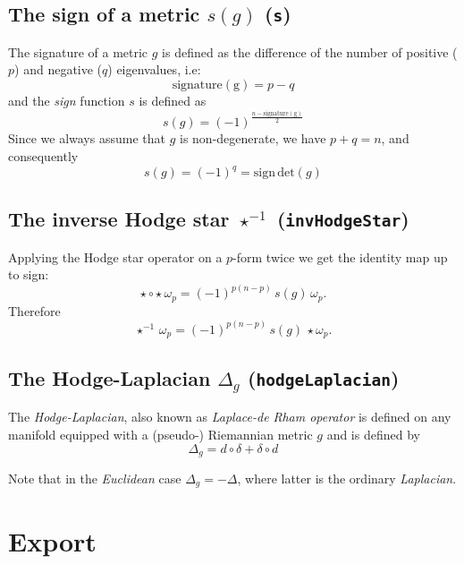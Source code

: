 \documentclass[12pt,a4paper]{article}
\begin{document}
\subsection{The sign of a metric  $s(g)$ ({\tt s})}
The signature of a metric $g$ is defined as the difference of
the number of positive ($p$) and negative ($q$) eigenvalues, i.e:
\begin{displaymath}
	\mathrm{signature(g)} = p - q
\end{displaymath}
and the {\it sign} function $s$ is defined as
\begin{displaymath}
	s(g) = (-1)^{\frac{n -\mathrm{signature(g)}}{2}} 
\end{displaymath}
Since we always assume that $g$ is non-degenerate, we have 
$p+q=n$, and consequently
\begin{displaymath}
	s(g) = (-1)^{q} = \mathrm{sign}\, \mathrm{det}(g)
\end{displaymath}
%

\subsection{ The inverse Hodge star $\star^{-1}$ ({\tt invHodgeStar})}
Applying the Hodge star operator on a $p$-form twice we get
the identity map up to sign:
\begin{displaymath}
	\star\circ\star\, \omega_p = (-1)^{p(n-p)}\,s(g)\,\omega_p.
\end{displaymath}
Therefore
\begin{displaymath}
	\star^{-1}\,\omega_p = (-1)^{p(n-p)}\,s(g)\,\star\omega_p. 
\end{displaymath}
%

\subsection{The Hodge-Laplacian $\Delta_g$ ({\tt hodgeLaplacian})}
The {\it Hodge-Laplacian}, also known as {\it Laplace-de Rham operator} 
is defined on any manifold equipped with a (pseudo-) Riemannian
metric $g$ and is defined by
\begin{displaymath}
	\Delta_g = d\circ\delta + \delta\circ d
\end{displaymath}

Note that in the {\it Euclidean} case $\Delta_g = - \Delta$, where
latter is the ordinary {\it Laplacian}.
%
%
%
\section{Export}
%
\end{document}
